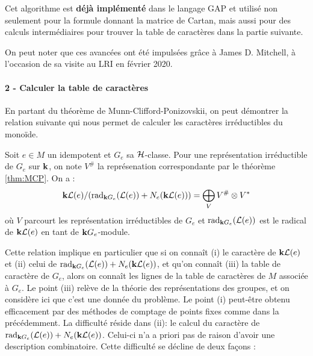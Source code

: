 \documentclass{article}
\begin{document}
	Cet algorithme est \textbf{déjà implémenté} dans le langage GAP et utilisé non seulement pour la formule donnant la matrice de Cartan, mais aussi pour des calculs intermédiaires pour trouver la table de caractères dans la partie suivante. 
	
	On peut noter que ces avancées ont été impulsées grâce à James D. Mitchell, à l'occasion de sa visite au LRI en février 2020.
	
	\paragraph{2 - Calculer la table de caractères}
	
	En partant du théorème de Munn-Clifford-Ponizovskii, on peut démontrer la relation suivante qui nous permet de calculer les caractères irréductibles du monoïde.
	
	\begin{prop}
		Soit $e \in M$ un idempotent et $G_e$ sa $\mathcal{H}$-classe. Pour une représentation irréductible de $G_e$ sur $\mathbf{k}$, on note $V^{\#}$ la représenation correspondante par le théorème \ref{thm:MCP}. On a :
		\[\mathbf{k}\mathcal{L}(e)/(\operatorname{rad}_{\mathbf{k} G_e}(\mathcal{L}(e)) + N_e(\mathbf{k} \mathcal{L}(e))) = \bigoplus_V V^{\#}\otimes V^*\]
		où $V$ parcourt les représentation irréductibles de $G_e$ et $\operatorname{rad}_{\mathbf{k} G_e}(\mathcal{L}(e))$ est le radical de $\mathbf{k} \mathcal{L}(e)$ en tant de $\mathbf{k} G_e$-module.
	\end{prop}
	
	Cette relation implique en particulier que si on connaît (i) le caractère de $\mathbf{k} \mathcal{L}(e)$ et (ii) celui de $\operatorname{rad}_{\mathbf{k} G_e}(\mathcal{L}(e)) + N_e(\mathbf{k} \mathcal{L}(e))$, et qu'on connaît (iii) la table de caractère de $G_e$, alors on connaît les lignes de la table de caractères de $M$ associée à $G_e$.
	Le point (iii) relève de la théorie des représentations des groupes, et on considère ici que c'est une donnée du problème. Le point (i) peut-être obtenu efficacement par des méthodes de comptage de points fixes comme dans la précédemment. La difficulté réside dans (ii): le calcul du caractère de $\operatorname{rad}_{\mathbf{k} G_e}(\mathcal{L}(e)) + N_e(\mathbf{k} \mathcal{L}(e))$. Celui-ci n'a a priori pas de raison d'avoir une description combinatoire. Cette difficulté se décline de deux façons :
	
\end{document}
